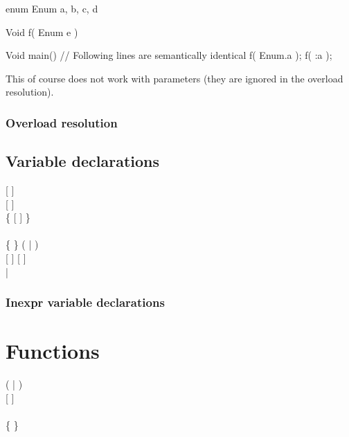 \begin{code}
enum Enum {
	a, b, c, d
}

Void f( Enum e ) {}

Void main() {
	// Following lines are semantically identical
	f( Enum.a );
	f( :a );	
}
\end{code}

This of course does not work with  parameters (they are ignored in the overload resolution).

\subsection{Overload resolution}



\section{Variable declarations}
\begin{grammar}
	   [  ] \\
	   [  ] \\
		\grLn \{ \kwd{,}  [  ] \} \kwd{;} \\
	\\
	 \{  \} (  |  ) \\
	  [  ] [ \kwd{!} ] \\
	  | \kwd{=}  \\
\end{grammar}

\subsection{Inexpr variable declarations}

\chapter{Functions}
\begin{grammar}
	    (  | \kwd{;} ) \\
	 [  \kwd{(}  \kwd{)} ]  \\
	\\
	 \kwd{\{} \{  \} \kwd{\}} \\
	  \\
		\grAltLn {} \kwd{;} \\
\end{grammar}

